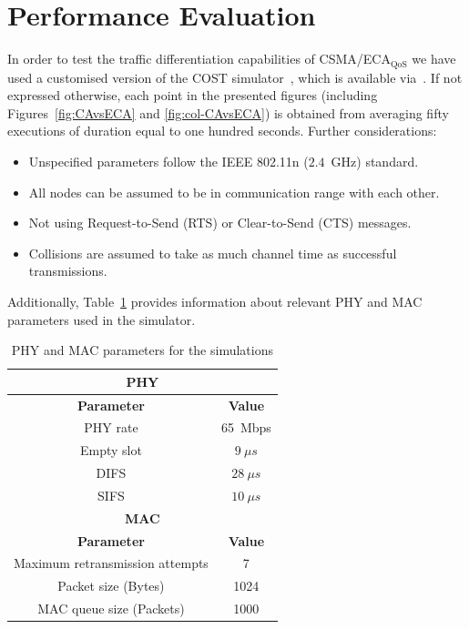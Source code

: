 \section{Performance Evaluation}\label{section4}
In order to test the traffic differentiation capabilities of CSMA/ECA$_{\text{QoS}}$ we have used a customised version of the COST simulator~\cite{COST}, which is available via~\cite{CSMA-ECA-HEW}. If not expressed otherwise, each point in the presented figures (including Figures~\ref{fig:CAvsECA} and \ref{fig:col-CAvsECA}) is obtained from averaging fifty executions of duration equal to one hundred seconds. Further considerations:
	\begin{itemize}
		\item Unspecified parameters follow the IEEE 802.11n ($2.4$~GHz) standard.
		\item All nodes can be assumed to be in communication range with each other.
		\item Not using Request-to-Send (RTS) or Clear-to-Send (CTS) messages.
		\item Collisions are assumed to take as much channel time as successful transmissions.
	\end{itemize}

Additionally, Table~\ref{tab:mac-params} provides information about relevant PHY and MAC parameters used in the simulator.
	\begin{table}
		\centering
		\caption{PHY and MAC parameters for the simulations}
		\label{tab:mac-params}
		\begin{tabular}{|c|c|}
			\hline
			\multicolumn{2}{|c|}{{\bfseries PHY}}\\
			\hline
			{\bfseries Parameter} & {\bfseries Value}\\
			\hline
			PHY rate & 65~Mbps\\
			Empty slot & $9~\mu s$\\
			DIFS & $28~\mu s$\\
			SIFS & $10~\mu s$\\
			\hline
			\multicolumn{2}{|c|}{{\bfseries MAC}}\\
			\hline
			{\bfseries Parameter} & {\bfseries Value}\\
			\hline
			Maximum retransmission attempts & 7\\
			Packet size (Bytes) & 1024\\
			MAC queue size (Packets) & 1000\\
			\hline
		\end{tabular}
	\end{table}
	
